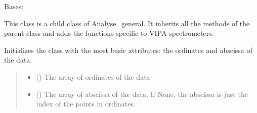 \documentclass[letterpaper,10pt,english]{sphinxmanual}
\begin{document}
\begin{fulllineitems}
\label{\detokenize{source/_autosummary/HDF5_BLS_analyse.Analyse_VIPA:HDF5_BLS_analyse.Analyse_VIPA}}
\pysigstartsignatures
\pysiglinewithargsret
{}
{\sphinxparamcomma {}}
{}
\pysigstopsignatures
\sphinxAtStartPar
Bases: {\hyperref[\detokenize{source/_autosummary/HDF5_BLS_analyse.Analyse_general:HDF5_BLS_analyse.Analyse_general}]{}}

\sphinxAtStartPar
This class is a child class of Analyse\_general. It inherits all the methods of the parent class and adds the functions specific to VIPA spectrometers.

\begin{fulllineitems}
\label{\detokenize{source/_autosummary/HDF5_BLS_analyse.Analyse_VIPA:HDF5_BLS_analyse.Analyse_VIPA.__init__}}
\pysigstartsignatures
\pysiglinewithargsret
{}
{\sphinxparamcomma {}}
{}
\pysigstopsignatures
\sphinxAtStartPar
Initializes the class with the most basic attributes: the ordinates and abscissa of the data.
\begin{quote}\begin{description}
\begin{itemize}
\item {} 
\sphinxAtStartPar
{} () \textendash{} The array of ordinates of the data

\item {} 
\sphinxAtStartPar
{} (\sphinxstyleliteralemphasis{\sphinxupquote{, }}) \textendash{} The array of abscissa of the data. If None, the abscissa is just the index of the points in ordinates.

\end{itemize}

\end{description}\end{quote}


\end{fulllineitems}
\end{fulllineitems}
\end{document}
